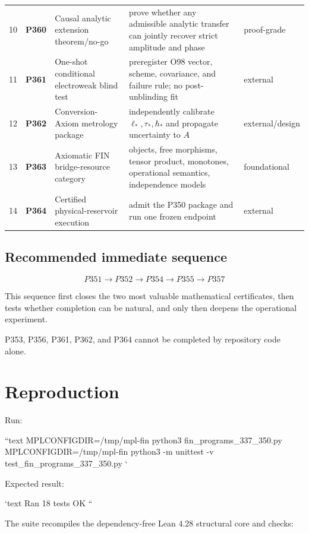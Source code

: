 \documentclass[11pt,a4paper,openany]{report}
\begin{document}
\begin{center}
\begin{longtable}{@{}p{}p{}p{}p{}p{}@{}}
10 & \textbf{P360} & Causal analytic extension theorem/\allowbreak{}no-go & prove whether any admissible analytic transfer can jointly recover strict amplitude and phase & proof-grade \\
11 & \textbf{P361} & One-shot conditional electroweak blind test & preregister O98 vector, scheme, covariance, and failure rule; no post-unblinding fit & external \\
12 & \textbf{P362} & Conversion-Axiom metrology package & independently calibrate \(\ell_*,\tau_*,\hbar_*\) and propagate uncertainty to \(A\) & external/\allowbreak{}design \\
13 & \textbf{P363} & Axiomatic FIN bridge-resource category & objects, free morphisms, tensor product, monotones, operational semantics, independence models & foundational \\
14 & \textbf{P364} & Certified physical-reservoir execution & admit the P350 package and run one frozen endpoint & external \\
\bottomrule
\end{longtable}
\endgroup
\end{center}

\section{Recommended immediate sequence}

\[
\boxed{
P351\rightarrow P352\rightarrow P354\rightarrow P355\rightarrow P357
}
\]

This sequence first closes the two most valuable mathematical certificates, then tests whether completion can be natural, and only then deepens the operational experiment.

P353, P356, P361, P362, and P364 cannot be completed by repository code alone.

\chapter{Reproduction}

Run:

``text MPLCONFIGDIR=/\allowbreak{}tmp/\allowbreak{}mpl-fin python3 fin\_programs\_337\_350.py MPLCONFIGDIR=/\allowbreak{}tmp/\allowbreak{}mpl-fin python3 -m unittest -v test\_fin\_programs\_337\_350.py `

Expected result:

`text Ran 18 tests OK ``

The suite recompiles the dependency-free Lean 4.28 structural core and checks:
\end{document}
